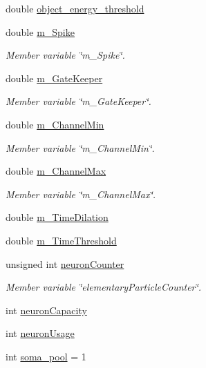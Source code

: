\begin{DoxyCompactItemize}
double \mbox{\hyperlink{classNeuron_ad0dd6393bdd85a09e35179cabd1083a2}{object\+\_\+energy\+\_\+threshold}}
\item 
double \mbox{\hyperlink{classNeuron_ab35fb4d7f3cc2b9491a2d9eb9d75c39a}{m\+\_\+\+Spike}}
\begin{DoxyCompactList}\small\item\em Member variable \char`\"{}m\+\_\+\+Spike\char`\"{}. \end{DoxyCompactList}\item 
double \mbox{\hyperlink{classNeuron_a44d4be63f49259ad3f475c695e38aa88}{m\+\_\+\+Gate\+Keeper}}
\begin{DoxyCompactList}\small\item\em Member variable \char`\"{}m\+\_\+\+Gate\+Keeper\char`\"{}. \end{DoxyCompactList}\item 
double \mbox{\hyperlink{classNeuron_aaba16c243f6b227b44609475e4e9a8cc}{m\+\_\+\+Channel\+Min}}
\begin{DoxyCompactList}\small\item\em Member variable \char`\"{}m\+\_\+\+Channel\+Min\char`\"{}. \end{DoxyCompactList}\item 
double \mbox{\hyperlink{classNeuron_a79b66d9cd9cc28601bffe154bee05525}{m\+\_\+\+Channel\+Max}}
\begin{DoxyCompactList}\small\item\em Member variable \char`\"{}m\+\_\+\+Channel\+Max\char`\"{}. \end{DoxyCompactList}\item 
double \mbox{\hyperlink{classNeuron_aa7f0b4aaf00fa2f9b8de0a0932d5fb65}{m\+\_\+\+Time\+Dilation}}
\item 
double \mbox{\hyperlink{classNeuron_a6e0b63b5c0aada57da5f5e4fe71f3955}{m\+\_\+\+Time\+Threshold}}
\item 
unsigned int \mbox{\hyperlink{classNeuron_a2ca1ab8d7891fbd10646a936e272cb7d}{neuron\+Counter}}
\begin{DoxyCompactList}\small\item\em Member variable \char`\"{}elementary\+Particle\+Counter\char`\"{}. \end{DoxyCompactList}\item 
int \mbox{\hyperlink{classNeuron_a56cdde5298abf121898ebd4ea99a738b}{neuron\+Capacity}}
\item 
int \mbox{\hyperlink{classNeuron_a785cf2a73a206d056db9633d447dbfb3}{neuron\+Usage}}
\item 
int \mbox{\hyperlink{classNeuron_a575bb396a026333541f5ff3ec1a90602}{soma\+\_\+pool}} = 1
\end{DoxyCompactItemize}
